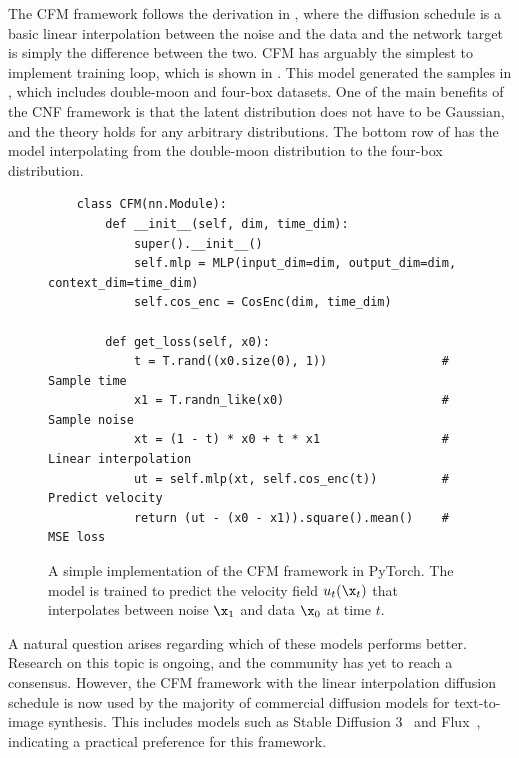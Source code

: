 The CFM framework follows the derivation in , where the diffusion schedule is a basic linear interpolation between the noise and the data and the network target is simply the difference between the two.
CFM has arguably the simplest to implement training loop, which is shown in .
This model generated the samples in , which includes double-moon and four-box datasets.
One of the main benefits of the CNF framework is that the latent distribution does not have to be Gaussian, and the theory holds for any arbitrary distributions.
The bottom row of  has the model interpolating from the double-moon distribution to the four-box distribution.

\begin{figure}
    \centering
    \scriptsize
    \begin{verbatim}
    class CFM(nn.Module):
        def __init__(self, dim, time_dim):
            super().__init__()
            self.mlp = MLP(input_dim=dim, output_dim=dim, context_dim=time_dim)
            self.cos_enc = CosEnc(dim, time_dim)

        def get_loss(self, x0):
            t = T.rand((x0.size(0), 1))                # Sample time
            x1 = T.randn_like(x0)                      # Sample noise
            xt = (1 - t) * x0 + t * x1                 # Linear interpolation
            ut = self.mlp(xt, self.cos_enc(t))         # Predict velocity
            return (ut - (x0 - x1)).square().mean()    # MSE loss
    \end{verbatim}
    \caption{A simple implementation of the CFM framework in PyTorch. The model is trained to predict the velocity field $u_t(\x_t)$ that interpolates between noise $\x_1$ and data $\x_0$ at time $t$.}
    \label{code:cfm}
\end{figure}

A natural question arises regarding which of these models performs better.
Research on this topic is ongoing, and the community has yet to reach a consensus.
However, the CFM framework with the linear interpolation diffusion schedule is now used by the majority of commercial diffusion models for text-to-image synthesis.
This includes models such as Stable Diffusion 3~\cite{SD3} and Flux~\cite{flux2024github}, indicating a practical preference for this framework.

